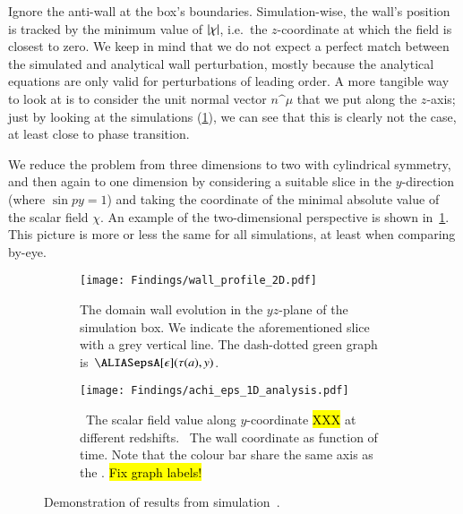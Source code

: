 



Ignore the anti-wall at the box's boundaries. 
Simulation-wise, the wall's position is tracked by the minimum value of $\abs{\chi}$, i.e.~the $z$-coordinate at which the field is closest to zero. %
We keep in mind that we do not expect a perfect match between the simulated and analytical wall perturbation, mostly because the analytical equations are only valid for perturbations of leading order. A more tangible way to look at is to consider the unit normal vector $n\^\mu$ that we put along the $z$-axis; just by looking at the simulations (\cref{fig:results:epsilon:wall_profile_2D}), we can see that this is clearly not the case, at least close to phase transition.


We reduce the problem from three dimensions to two with cylindrical symmetry, and then again to one dimension by considering a suitable slice in the $y$-direction %
(where $\sin{py} =1$) %
and taking the coordinate of the minimal absolute value of the scalar field $\chi$. An example of the two-dimensional perspective is shown in~\cref{fig:results:epsilon:wall_profile_2D}. This picture is more or less the same for all simulations, at least when comparing by-eye.     

\begin{figure}[ht]
    \centering
    \begin{subfigure}[b]{\linewidth}
        \centering
        \texttt{[image: Findings/wall\_profile\_2D.pdf]}
        \caption{The domain wall evolution in the $yz$-plane of the simulation box. We indicate the aforementioned slice with a grey vertical line. The dash-dotted green graph is~$\epsA[\epsilon](\tau(a), y)$.}
        \label{fig:results:epsilon:wall_profile_2D}
    \end{subfigure}
    \hfill
    \begin{subfigure}[b]{\linewidth}
        \centering
        \texttt{[image: Findings/achi\_eps\_1D\_analysis.pdf]}
        \caption{~The scalar field value along $y$-coordinate \hl{XXX} at different redshifts. ~The wall coordinate as function of time. Note that the colour bar share the same axis as the \blahblah. \hl{Fix graph labels!}}
        \label{fig:results:epsilon:achi_eps_1D_analysis}
    \end{subfigure}
    \caption{Demonstration of results from simulation~.}
    \label{fig:results:epsilon:from_achi_to_epsilon}
\end{figure}


